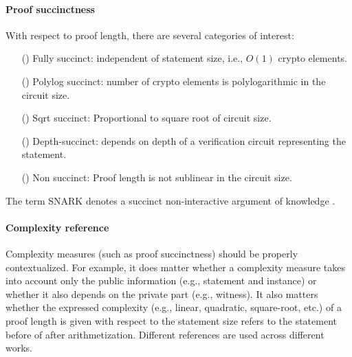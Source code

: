 \paragraph{Proof succinctness}\label{feat:succint}
With respect to proof length, there are several categories of interest:
\begin{enumerate}
\item[(\newsubfeat)\label{subfeat:succinct:fully}] Fully succinct: independent of statement size, i.e., $O(1)$ crypto elements.
\item[(\newsubfeat)\label{subfeat:succinct:polylog}] Polylog succinct: number of crypto elements is polylogarithmic in the circuit size.
\item[(\newsubfeat)\label{subfeat:succinct:sqrt}] Sqrt succinct: Proportional to square root of circuit size.
\item[(\newsubfeat)\label{subfeat:succinct:depth}] Depth-succinct: depends on depth of a verification circuit representing the statement.
\item[(\newsubfeat)\label{subfeat:succinct:non}] Non succinct: Proof length is not sublinear in the circuit size.
\end{enumerate}
The term SNARK %
denotes a succinct non-interactive argument of knowledge \cite{2017:BCCGLRT:Jr-Crypt:hunting-snarks}.


\paragraph{Complexity reference}\label{complexity-reference}
Complexity measures (such as proof succinctness) should be properly contextualized. 
For example, it does matter whether a complexity measure takes into account only the public information (e.g., statement and instance) or whether it also depends on the private part (e.g., witness).
It also matters whether the expressed complexity (e.g., linear, quadratic, square-root, etc.) of a proof length is given with respect to the statement size refers to the statement before of after arithmetization.
Different references are used across different works.


